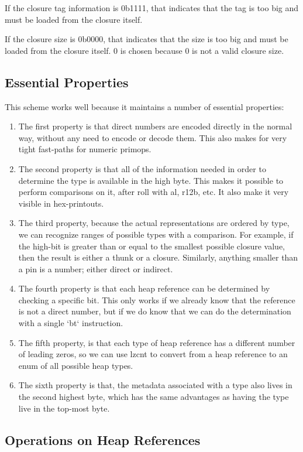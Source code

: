 If the closure tag information is 0b1111, that indicates that the tag
is too big and must be loaded from the closure itself.

If the closure size is 0b0000, that indicates that the size is too big
and must be loaded from the closure itself.  0 is chosen because 0 is
not a valid closure size.

\subsection{Essential Properties}

This scheme works well because it maintains a number of essential
properties:

\begin{enumerate}
\item
The first property is that direct numbers are encoded directly in the
normal way, without any need to encode or decode them.  This also makes
for very tight fast-paths for numeric primops.
\item
The second property is that all of the information needed in order to
determine the type is available in the high byte.  This makes it possible
to perform comparisons on it, after roll with al, r12b, etc.  It also
make it very visible in hex-printouts.
\item
The third property, because the actual representations are ordered
by type, we can recognize ranges of possible types with a comparison.
For example, if the high-bit is greater than or equal to the smallest
possible closure value, then the result is either a thunk or a closure.
Similarly, anything smaller than a pin is a number; either direct or
indirect.
\item
The fourth property is that each heap reference can be determined by
checking a specific bit.  This only works if we already know that the
reference is not a direct number, but if we do know that we can do the
determination with a single `bt` instruction.
\item
The fifth property, is that each type of heap reference has a different
number of leading zeros, so we can use lzcnt to convert from a heap
reference to an enum of all possible heap types.
\item
The sixth property is that, the metadata associated with a type also
lives in the second highest byte, which has the same advantages as having
the type live in the top-most byte.
\end{enumerate}

\subsection{Operations on Heap References}

